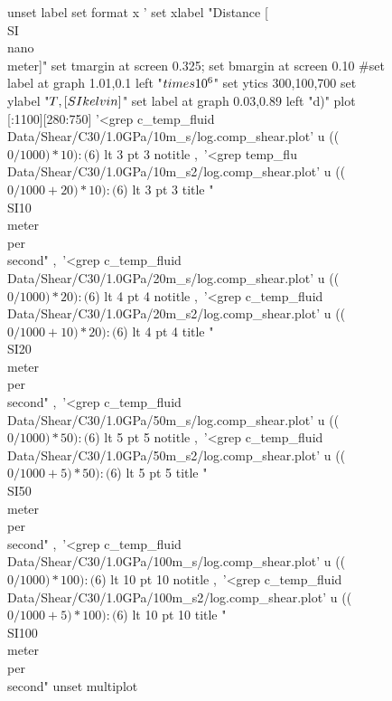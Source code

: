 \documentclass[aps,prb,reprint,superscriptaddress, a4paper]{revtex4-1}
\begin{document}
\begin{figure}
\begin{center}
\begin{gnuplot}[terminal=pdf, terminaloptions={size \SERFigwidth cm, \SERFigheight cm color solid}]
			unset label
			set format x '%
			set xlabel "Distance [\\SI{}{\\nano\\meter}]"  
			set tmargin at screen 0.325; set bmargin at screen 0.10
			#set label at graph 1.01,0.1 left "$\\times 10^{6}$"
			set ytics 300,100,700
			set ylabel "$T \\, [\\SI{}{\\kelvin}]$"          
			set label at graph 0.03,0.89 left "d)"
			plot  [:1100][280:750] 	'<grep c_temp_fluid Data/Shear/C30/1.0GPa/10m_s/log.comp_shear.plot'     u (($0/1000)*10):($6)        lt 3    pt 3    notitle ,\
								'<grep temp_flu Data/Shear/C30/1.0GPa/10m_s2/log.comp_shear.plot'   u (($0/1000+20)*10):($6) lt 3    pt 3    title  "\\SI{10}{\\meter\\per\\second}" ,\
								'<grep c_temp_fluid Data/Shear/C30/1.0GPa/20m_s/log.comp_shear.plot'     u (($0/1000)*20):($6)        lt 4    pt 4    notitle ,\
								'<grep c_temp_fluid Data/Shear/C30/1.0GPa/20m_s2/log.comp_shear.plot'   u (($0/1000+10)*20):($6) lt 4    pt 4    title  "\\SI{20}{\\meter\\per\\second}" ,\
								'<grep c_temp_fluid Data/Shear/C30/1.0GPa/50m_s/log.comp_shear.plot'     u (($0/1000)*50):($6)        lt 5    pt 5    notitle ,\
								'<grep c_temp_fluid Data/Shear/C30/1.0GPa/50m_s2/log.comp_shear.plot'   u (($0/1000+5)*50):($6)   lt 5    pt 5     title  "\\SI{50}{\\meter\\per\\second}" ,\
								'<grep c_temp_fluid Data/Shear/C30/1.0GPa/100m_s/log.comp_shear.plot'   u (($0/1000)*100):($6)     lt 10  pt 10   notitle ,\
								'<grep c_temp_fluid Data/Shear/C30/1.0GPa/100m_s2/log.comp_shear.plot' u (($0/1000+5)*100):($6) lt 10  pt 10  title  "\\SI{100}{\\meter\\per\\second}"
			unset multiplot
		\end{gnuplot}


\end{center}
\end{figure}
\end{document}
